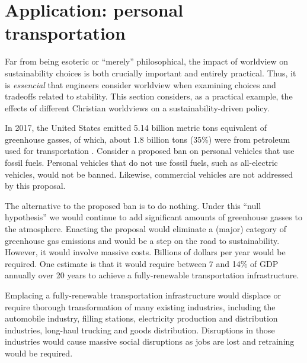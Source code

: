 \documentclass[12pt]{article}
\begin{document}
\section{Application: personal transportation}
\label{sec:personal_transportation}

Far from being esoteric or ``merely'' philosophical, the impact of worldview on sustainability choices is both crucially important and entirely practical. 
Thus, it is \emph{essencial} that engineers consider worldview when examining choices and tradeoffs related to stability.
This section considers, as a practical example, the effects of different Christian worldviews on a sustainability-driven policy.

In 2017, the United States emitted 5.14 billion metric tons equivalent of greenhouse gasses, of which, 
about 1.8 billion tons (35\%) were from petroleum used for transportation \cite{EIA2017}.
Consider a proposed ban on personal vehicles that use fossil fuels.
Personal vehicles that do not use fossil fuels, such as all-electric vehicles, would not be banned. 
Likewise, commercial vehicles are not addressed by this proposal. %

The alternative to the proposed ban is to do nothing. 
Under this ``null hypothesis'' we would continue to add significant amounts of greenhouse gasses to the atmosphere.
Enacting the proposal would eliminate a (major) category of greenhouse gas emissions and would be a step on the road to sustainability.
However, it would involve massive costs. Billions of dollars per year would be required. 
One estimate is that it would require between 7 and 14\% of GDP annually 
over 20 years to achieve a fully-renewable transportation infrastructure.

Emplacing a fully-renewable transportation infrastructure 
would displace or require thorough transformation of many existing industries, 
including the automobile industry,  filling stations, 
electricity production and distribution industries, 
long-haul trucking and goods distribution. %
Disruptions in those industries 
would cause massive social disruptions 
as jobs are lost and retraining would be required.
\end{document}
